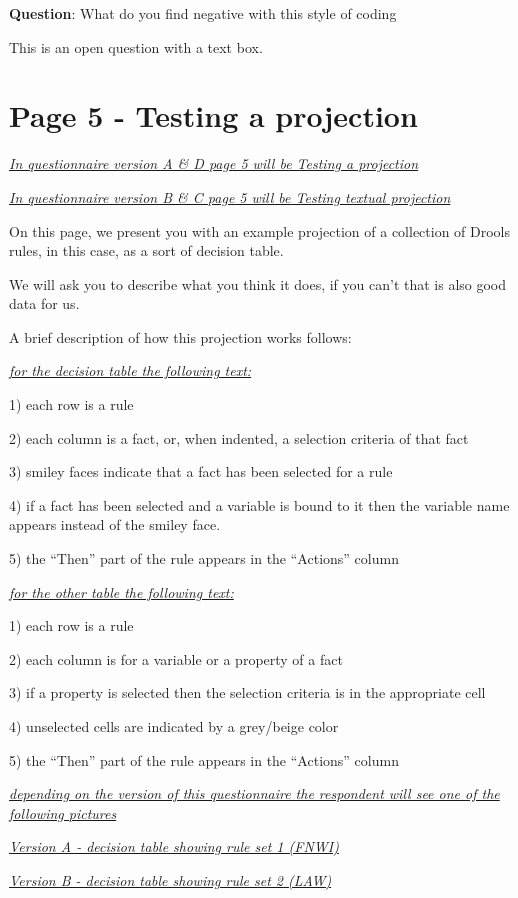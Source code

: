 \textbf{Question}: What do you find negative with this style of coding

This is an open question with a text box.

\section*{Page 5 - Testing a projection}
\emph{\underline{In questionnaire version A \& D page 5 will be Testing a projection}}

\emph{\underline{In questionnaire version B \& C page 5 will be Testing textual projection}}

On this page, we present you with an example projection of a collection of Drools rules, in this case, as a sort of decision table.

We will ask you to describe what you think it does, if you can't that is also good data for us.

A brief description of how this projection works follows:

\emph{\underline{for the decision table the following text:}}

1) each row is a rule

2) each column is a fact, or, when indented, a selection criteria of that fact

3) smiley faces indicate that a fact has been selected for a rule

4) if a fact has been selected and a variable is bound to it then the variable name appears instead of the smiley face.

5) the ``Then'' part of the rule appears in the ``Actions'' column

\emph{\underline{for the other table the following text:}}

1) each row is a rule

2) each column is for a variable or a property of a fact

3) if a property is selected then the selection criteria is in the appropriate cell

4) unselected cells are indicated by a grey/beige color

5) the ``Then'' part of the rule appears in the ``Actions'' column


\emph{\underline{depending on the version of this questionnaire the respondent will see one of the following pictures}}

\emph{\underline{Version A - decision table showing rule set 1 (FNWI)}}

\emph{\underline{Version B - decision table showing rule set 2 (LAW)}}

